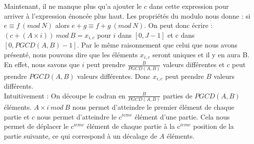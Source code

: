 Maintenant, il ne manque plus qu'a ajouter le $c$ dans cette expression pour arriver à l'expression énoncée plus haut. Les propriétés du modulo nous donne : si $e ≡ f\ (mod\ N)$ alors $e+g ≡ f+g\ (mod\ N)$. On peut donc écrire : $(c +(A\times i))\ mod\ B = x_{i,c}$ pour $i$ dans $[0, J-1]$ et c dans $[0, PGCD(A,B) -1]$. Par le même raisonnement que celui que nous avons présenté, nous pouvons dire que les éléments $x_{i,c}$ seront uniques et il y en aura B.\\
En effet, nous savons que $i$ peut prendre $\frac{B}{PGCD(A,B)}$ valeurs différentes et $c$ peut prendre $PGCD(A,B)$ valeurs différentes. Donc $x_{i,c}$ peut prendre $B$ valeurs différents.\\

Intuitivement : On découpe le cadran en $\frac{B}{PGCD(A,B)}$ parties de $PGCD(A,B)$ éléments. 
$A\times i\ mod\ B$ nous permet d'atteindre le premier élément de chaque partie et $c$ nous permet d'atteindre le $c^{ieme}$ élément d'une partie. 
Cela nous permet de déplacer le $c^{ieme}$ élément de chaque partie à la c$^{ieme}$ position de la partie suivante, ce qui correspond à un décalage de $A$ éléments.